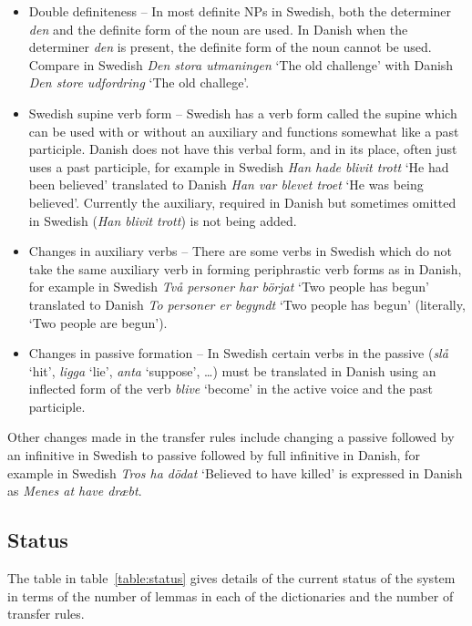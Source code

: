 \documentclass[11pt]{article}
\begin{document}
\begin{itemize}
  \item  Double definiteness -- In most definite NPs in Swedish, both the determiner \emph{den}
    and the definite form of the noun are used. In Danish when the determiner \emph{den} is 
    present, the definite form of the noun cannot be used. Compare in Swedish \emph{Den stora utmaningen}
    `The old challenge' with Danish \emph{Den store udfordring} `The old challege'.

  \item  Swedish supine verb form -- Swedish has a verb form called the supine which can be used with
    or without an auxiliary and functions somewhat like a past participle. Danish does not have this 
    verbal form, and in its place, often just uses a past participle, for example in Swedish 
    \emph{Han hade blivit trott} `He had been believed' translated to Danish \emph{Han var blevet troet} 
    `He was being believed'.
    Currently the auxiliary, required in Danish but sometimes omitted in Swedish (\emph{Han blivit trott}) is not being added.
  \item  Changes in auxiliary verbs -- There are some verbs in Swedish which do not take the same 
    auxiliary verb in forming periphrastic verb forms as in Danish, for example in Swedish \emph{Två 
    personer har börjat} `Two people has begun' translated to Danish \emph{To personer er begyndt} 
    `Two people has begun' (literally, `Two people are begun').
  \item  Changes in passive formation -- In Swedish certain verbs in the passive (\emph{slå} `hit', 
    \emph{ligga} `lie', \emph{anta} `suppose', \ldots) must be translated in Danish using an inflected 
    form of the verb \emph{blive} `become' in the active voice and the past participle.
\end{itemize}

Other changes made in the transfer rules include changing a passive followed by an infinitive in Swedish
to passive followed by full infinitive in Danish, for example in Swedish \emph{Tros ha dödat} `Believed to have killed' is expressed in Danish as \emph{Menes at have dræbt}.

\subsection{Status}

The table in table~\ref{table:status} gives details of the current status of the system
in terms of the number of lemmas in each of the dictionaries and the number of transfer rules.
\end{document}
